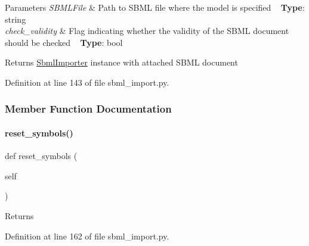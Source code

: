 \begin{DoxyParams}{Parameters}
{\em S\+B\+M\+L\+File} & Path to S\+B\+ML file where the model is specified ~\newline
{\bfseries Type}\+: string\\
\hline
{\em check\+\_\+validity} & Flag indicating whether the validity of the S\+B\+ML document should be checked ~\newline
{\bfseries Type}\+: bool\\
\hline
\end{DoxyParams}
\begin{DoxyReturn}{Returns}
\mbox{\hyperlink{classamici_1_1sbml__import_1_1_sbml_importer}{Sbml\+Importer}} instance with attached S\+B\+ML document 
\end{DoxyReturn}


Definition at line 143 of file sbml\+\_\+import.\+py.



\subsubsection{Member Function Documentation}
\mbox{\label{classamici_1_1sbml__import_1_1_sbml_importer_a17147ce5084526fa003563813c1be230}} 
\paragraph{\texorpdfstring{reset\+\_\+symbols()}{reset\_symbols()}}
{\footnotesize\ttfamily def reset\+\_\+symbols (\begin{DoxyParamCaption}\item[{}]{self }\end{DoxyParamCaption})}

\begin{DoxyReturn}{Returns}

\end{DoxyReturn}


Definition at line 162 of file sbml\+\_\+import.\+py.

